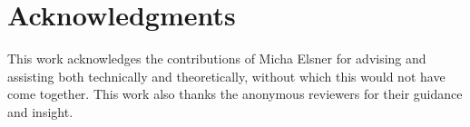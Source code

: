 \documentclass[11pt]{article}
\begin{document}
\section*{Acknowledgments}
This work acknowledges the contributions of Micha Elsner for advising and assisting both technically and theoretically, without which this would not have come together.
This work also thanks the anonymous reviewers for their guidance and insight.


\end{document}
